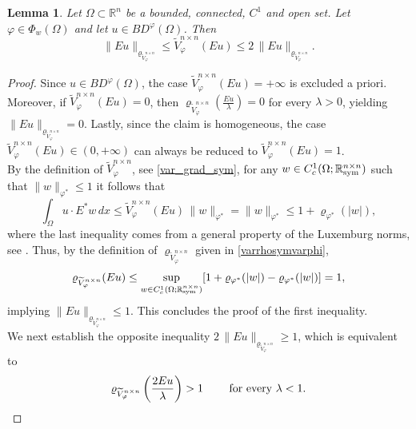 \documentclass[a4paper,11pt,oneside,notitlepage]{article}
\newtheorem{lemma}[theorem]{Lemma}
\numberwithin{equation}{section}
\def\R{\mathbb{R}}
\def\sym{{\rm sym}}
\newcommand{\vphi}{\varphi}
\newcommand{\vrho}{\varrho}
\begin{document}
\begin{lemma}
\label{lem:equivalence}
    Let $\Omega \subset \R^n$ be a bounded, connected, $C^1$ and open set. Let $\vphi \in \Phi_w(\Omega)$ and let $u \in BD^\vphi(\Omega)$. Then
    \begin{equation*}
        \|Eu\|_{\vrho_{\widetilde{V}^{n \times n}_\vphi}} \le \widetilde{V}^{n\times n}_\vphi(Eu) \le 2 \, \|Eu\|_{\vrho_{\widetilde{V}^{n \times n}_\vphi}}.
    \end{equation*}
\end{lemma}
\begin{proof}
    Since $u \in BD^\vphi(\Omega)$, the case $\widetilde{V}^{n \times n}_\vphi(E u) = +\infty$ is excluded a priori. Moreover, if $\widetilde{V}^{n \times n}_\vphi(Eu) = 0$, then $\vrho_{\widetilde{V}^{n \times n}_\vphi}(\frac{Eu}{\lambda}) = 0$ for every $\lambda > 0$, yielding $\|Eu\|_{\vrho_{\widetilde{V}^{n \times n}_\vphi}} = 0$. Lastly, since the claim is homogeneous, the case $\widetilde{V}^{n \times n}_\vphi(Eu) \in (0,+\infty)$ can always be reduced to $\widetilde{V}^{n \times n}_\vphi(Eu) = 1$. 
    \\
    By the definition of $\widetilde{V}^{n \times n}_\vphi$, see \eqref{var_grad_sym}, for any $w \in C^1_c(\Omega;\R^{n \times n}_\sym)$ such that $\|w\|_{\vphi^*} \le 1$ it follows that 
    \begin{equation*}
        \int_\Omega u \cdot E^*w \, dx \le \widetilde{V}^{n \times n}_\vphi(Eu) \, \|w\|_{\vphi^*} = \|w\|_{\vphi^*} \le 1 + \vrho_{\vphi^*}(|w|),
    \end{equation*}
    where the last inequality comes from a general property of the Luxemburg norms, see \cite[Corollary 2.1.15]{HHbook}. Thus, by the definition of $\vrho_{\widetilde{V}^{n \times n}_\vphi}$ given in \eqref{varrhosymvarphi},
    \begin{equation*}
        \vrho_{\widetilde{V}^{n \times n}_\vphi}(Eu) \le \sup_{w \in C^1_c(\Omega; \R^{n \times n}_\sym)} [1 + \vrho_{\vphi^*}(|w|) - \vrho_{\vphi^*}(|w|)] = 1,
    \end{equation*}
    implying $\|E u\|_{\vrho_{\widetilde{V}^{n \times n}_\vphi}} \le 1$. This concludes the proof of the first inequality. 
    \\
    We next establish the opposite inequality $2 \, \|Eu\|_{\vrho_{\widetilde{V}^{n \times n}_\vphi}} \ge 1$, which is equivalent to
    \begin{equation}
    \label{eq:mod_magg}
        \vrho_{\widetilde{V}^{n \times n}_\vphi} \left(\frac{2Eu}{\lambda} \right) > 1 \qquad \textnormal{ for every } \lambda < 1.

\end{equation}
\end{proof}
\end{document}

